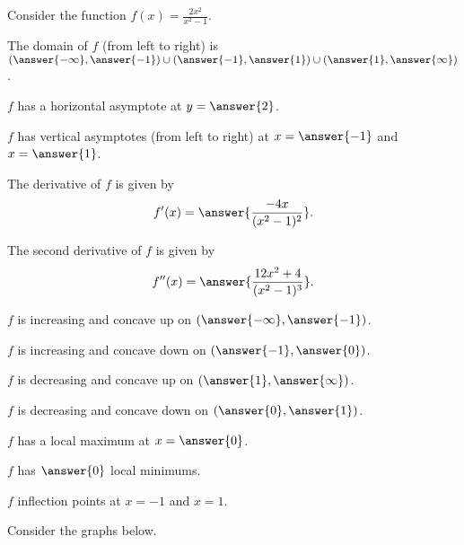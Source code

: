 \documentclass{ximera}
\author{Nela Lakos \and Kyle Parsons}
\begin{document}
\begin{exercise}

Consider the function $f(x) = \frac{2x^2}{x^2-1}$.

The domain of $f$ (from left to right) is $\left(\answer{-\infty},\answer{-1}\right)\cup\left(\answer{-1},\answer{1}\right)\cup\left(\answer{1},\answer{\infty}\right)$.

$f$ has a horizontal asymptote at $y=\answer{2}$.

$f$ has vertical asymptotes (from left to right) at $x=\answer{-1}$ and $x=\answer{1}$.

The derivative of $f$ is given by 
\[
f'(x) = \answer{\frac{-4x}{(x^2-1)^2}}.
\]

The second derivative of $f$ is given by
\[
f''(x) = \answer{\frac{12x^2+4}{(x^2-1)^3}}.
\]

$f$ is increasing and concave up on $\left(\answer{-\infty},\answer{-1}\right)$.

$f$ is increasing and concave down on $\left(\answer{-1},\answer{0}\right)$.

$f$ is decreasing and concave up on $\left(\answer{1},\answer{\infty}\right)$.

$f$ is decreasing and concave down on $\left(\answer{0},\answer{1}\right)$.

$f$ has a local maximum at $x=\answer{0}$.

$f$ has $\answer{0}$ local minimums.

$f$  inflection points at $x=-1$ and $x=1$.

Consider the graphs below.

\end{exercise}
\end{document}
